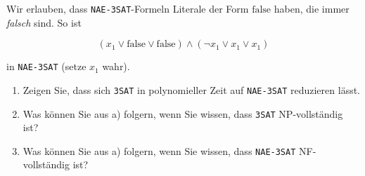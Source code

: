 \documentclass{bschlangaul-aufgabe}
\begin{document}
\noindent
Wir erlauben, dass \texttt{NAE-3SAT}-Formeln Literale der Form
$\text{false}$ haben, die immer \emph{falsch} sind. So ist

\begin{displaymath}
(x_1 \lor \text{false} \lor \text{false})
\land
(\neg x_1 \lor x_1 \lor x_1)
\end{displaymath}

in \texttt{NAE-3SAT} (setze $x_1$ wahr).
\begin{enumerate}


\item Zeigen Sie, dass sich \texttt{3SAT} in polynomieller Zeit auf
\texttt{NAE-3SAT} reduzieren lässt.

\begin{bAntwort}
\end{bAntwort}


\item Was können Sie aus a) folgern, wenn Sie wissen, dass \texttt{3SAT}
NP-vollständig ist?

\begin{bAntwort}
\end{bAntwort}


\item Was können Sie aus a) folgern, wenn Sie wissen, dass
\texttt{NAE-3SAT} NF-vollständig ist?

\begin{bAntwort}
\end{bAntwort}

\end{enumerate}
\end{document}
